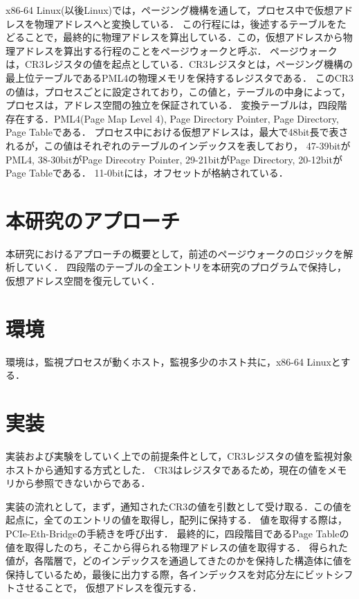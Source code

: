 \documentclass[a4j,10pt]{jsarticle}
\begin{document}
    x86-64 Linux(以後Linux)では，ページング機構を通して，プロセス中で仮想アドレスを物理アドレスへと変換している．
    この行程には，後述するテーブルをたどることで，最終的に物理アドレスを算出している．この，仮想アドレスから物理アドレスを算出する行程のことをページウォークと呼ぶ．
    ページウォークは，CR3レジスタの値を起点としている．CR3レジスタとは，ページング機構の最上位テーブルであるPML4の物理メモリを保持するレジスタである．
    このCR3の値は，プロセスごとに設定されており，この値と，テーブルの中身によって，プロセスは，アドレス空間の独立を保証されている．
    変換テーブルは，四段階存在する．PML4(Page Map Level 4), Page Directory Pointer, Page Directory, Page Tableである．
    プロセス中における仮想アドレスは，最大で48bit長で表されるが，この値はそれぞれのテーブルのインデックスを表しており，
    47-39bitがPML4, 38-30bitがPage Direcotry Pointer, 29-21bitがPage Directory, 20-12bitがPage Tableである．
    11-0bitには，オフセットが格納されている．

    \section{本研究のアプローチ}

    本研究におけるアプローチの概要として，前述のページウォークのロジックを解析していく．
    四段階のテーブルの全エントリを本研究のプログラムで保持し，仮想アドレス空間を復元していく．

    \section{環境}

    環境は，監視プロセスが動くホスト，監視多少のホスト共に，x86-64 Linuxとする．



    \section{実装}

    実装および実験をしていく上での前提条件として，CR3レジスタの値を監視対象ホストから通知する方式とした．
    CR3はレジスタであるため，現在の値をメモリから参照できないからである．

    実装の流れとして，まず，通知されたCR3の値を引数として受け取る．この値を起点に，全てのエントリの値を取得し，配列に保持する．
    値を取得する際は，PCIe-Eth-Bridgeの手続きを呼び出す．
    最終的に，四段階目であるPage Tableの値を取得したのち，そこから得られる物理アドレスの値を取得する．
    得られた値が，各階層で，どのインデックスを通過してきたのかを保持した構造体に値を保持しているため，最後に出力する際，各インデックスを対応分左にビットシフトさせることで，
    仮想アドレスを復元する．
\end{document}
